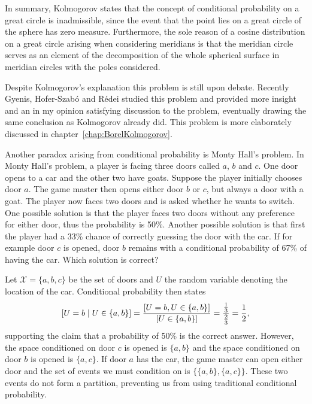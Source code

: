 \documentclass[twoside,a4paper]{report}
\theoremstyle{plain}
\theoremstyle{definition}
\theoremstyle{remark}
\numberwithin{equation}{chapter}
\let\P\relax
\DeclareMathOperator{\P}{\mathbb{P}}
\DeclareMathOperator{\1}{\mathbbm{1}}
\newcommand{\X}{\mathcal{X}}
\begin{document}
In summary, Kolmogorov states that the concept of conditional probability on a great circle is inadmissible, since the event that the point lies on a great circle of the sphere has zero measure. Furthermore, the sole reason of a cosine distribution on a great circle arising when considering meridians is that the meridian circle serves as an element of the decomposition of the whole spherical surface in meridian circles with the poles considered.

Despite Kolmogorov's explanation this problem is still upon debate. Recently Gyenis, Hofer-Szabó and Rédei \cite{Gyenis17} studied this problem and provided more insight and an in my opinion satisfying discussion to the problem, eventually drawing the same conclusion as Kolmogorov already did. This problem is more elaborately discussed in chapter~\ref{chap:BorelKolmogorov}.

Another paradox arising from conditional probability is Monty Hall's problem. In Monty Hall's problem, a player is facing three doors called $a$, $b$ and $c$. One door opens to a car and the other two have goats. Suppose the player initially chooses door $a$. The game master then opens either door $b$ or $c$, but always a door with a goat. The player now faces two doors and is asked whether he wants to switch. One possible solution is that the player faces two doors without any preference for either door, thus the probability is 50\%. Another possible solution is that first the player had a 33\% chance of correctly guessing the door with the car. If for example door $c$ is opened, door $b$ remains with a conditional probability of 67\% of having the car. Which solution is correct?

Let $\X=\{a,b,c\}$ be the set of doors and $U$ the random variable denoting the location of the car. Conditional probability then states
\begin{equation*}\label{eq:IntMonty}
\P[U=b\mid U\in\{a,b\}]=\frac{\P[U=b,U\in\{a,b\}]}{\P[U\in\{a,b\}]}=\frac{\frac{1}{3}}{\frac{2}{3}}=\frac{1}{2},
\end{equation*}
supporting the claim that a probability of 50\% is the correct answer. However, the space conditioned on door $c$ is opened is $\{a,b\}$ and the space conditioned on door $b$ is opened is $\{a,c\}$. If door $a$ has the car, the game master can open either door and the set of events we must condition on is $\{\{a,b\},\{a,c\}\}$. These two events do not form a partition, preventing us from using traditional conditional probability.
\end{document}
